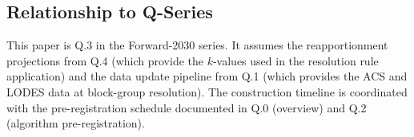 \subsection{Relationship to Q-Series}

This paper is Q.3 in the Forward-2030 series. It assumes the reapportionment
projections from Q.4 (which provide the $k$-values used in the resolution rule
application) and the data update pipeline from Q.1 (which provides the ACS and
LODES data at block-group resolution). The construction timeline is coordinated
with the pre-registration schedule documented in Q.0 (overview) and Q.2
(algorithm pre-registration).
